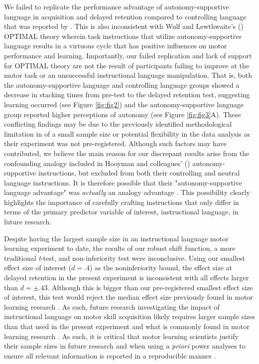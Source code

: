 \documentclass[man,floatsintext,donotrepeattitle,letterpaper,12pt]{apa7}
\begin{document}
We failed to replicate the performance advantage of autonomy-supportive language in acquisition and delayed retention compared to controlling language that was reported by \textcite{hooyman2014}. This is also inconsistent with Wulf and Lewthwaite's (\citeyear{wulf2016}) OPTIMAL theory wherein task instructions that utilize autonomy-supportive language results in a virtuous cycle that has positive influences on motor performance and learning. Importantly, our failed replication and lack of support for OPTIMAL theory are not the result of participants failing to improve at the motor task or an unsuccessful instructional language manipulation. That is, both the autonomy-supportive language and controlling language groups showed a decrease in stacking times from pre-test to the delayed retention test, suggesting learning occurred (see Figure \ref{fig:fig2}) and the autonomy-supportive language group reported higher perceptions of autonomy (see Figure \ref{fig:fig3}A). These conflicting findings may be due to the previously identified methodological limitation in \textcite{hooyman2014} of a small sample size or potential flexibility in the data analysis as their experiment was not pre-registered. Although such factors may have contributed, we believe the main reason for our discrepant results arise from the confounding analogy included in Hooyman and colleagues' (\citeyear{hooyman2014}) autonomy-supportive instructions, but excluded from both their controlling and neutral language instructions. It is therefore possible that their "autonomy-supportive language advantage" was \emph{actually} an analogy advantage \autocite[e.g.,][]{liao2001,masters2020}. This possibility clearly highlights the importance of carefully crafting instructions that only differ in terms of the primary predictor variable of interest, instructional language, in future research.

Despite having the largest sample size in an instructional language motor learning experiment to date, the results of our robust shift function, a more traditional \emph{t}-test, and non-inferiority test were inconclusive. Using our smallest effect size of interest ($d = .4$) as the noninferiority bound, the effect size at delayed retention in the present experiment is inconsistent with all effects larger than $d = \pm.43$. Although this is bigger than our pre-registered smallest effect size of interest, this test would reject the median effect size previously found in motor learning research \autocite[\emph{d} = .63 by][]{lohse2016}. As such, future research investigating the impact of instructional language on motor skill acquisition likely requires larger sample sizes than that used in the present experiment and what is commonly found in motor learning research \autocite[see][for discussions]{lohse2016,mckay2023}. As such, it is critical that motor learning scientists justify their sample sizes in future research \autocite[e.g.,][]{lakens2022,mckay2023a} and when using \emph{a priori} power analyses to ensure all relevant information is reported in a reproducible manner \autocite{mckay2023b}.
\end{document}
